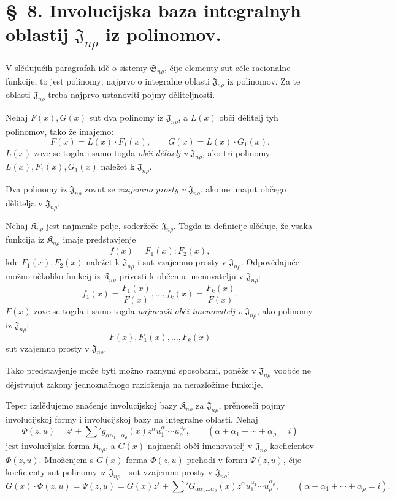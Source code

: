 \documentclass[11pt]{article}
\providecommand{\Kfield}{\mathfrak{K}}
\providecommand{\Ssys}{\mathfrak{S}}
\providecommand{\Jdom}{\mathfrak{J}}
\begin{document}
\section*{\S\ 8. Involucijska baza integralnyh oblastij $\Jdom_{n\rho}$ iz polinomov.}

V slědujućih paragrafah idě o sistemy $\Ssys_{n\rho}$, čije elementy sut cěle racionalne funkcije, to jest polinomy; najprvo o integralne oblasti $\Jdom_{n\rho}$ iz polinomov. Za te oblasti $\Jdom_{n\rho}$ treba najprvo ustanoviti pojmy děliteljnosti.

Nehaj $F(x),G(x)$ sut dva polinomy iz $\Jdom_{n\rho}$, a $L(x)$ obči dělitelj tyh polinomov, tako že imajemo:
\[
  F(x)=L(x)\cdot F_1(x),\qquad G(x)=L(x)\cdot G_1(x).
\]
$L(x)$ zove se togda i samo togda {\itshape obči dělitelj v $\Jdom_{n\rho}$}, ako tri polinomy $L(x),F_1(x),G_1(x)$ naležet k $\Jdom_{n\rho}$.

Dva polinomy iz $\Jdom_{n\rho}$ zovut se {\itshape vzajemno prosty v $\Jdom_{n\rho}$}, ako ne imajut občego dělitelja v $\Jdom_{n\rho}$.

Nehaj $\Kfield_{n\rho}$ jest najmenše polje, soderžeče $\Jdom_{n\rho}$. Togda iz definicije slěduje, že vsaka funkcija iz $\Kfield_{n\rho}$ imaje predstavjenje
\[
  f(x)=F_1(x):F_2(x),
\]
kde $F_1(x),F_2(x)$ naležet k $\Jdom_{n\rho}$ i sut vzajemno prosty v $\Jdom_{n\rho}$. Odpovědajuče možno několiko funkcij iz $\Kfield_{n\rho}$ privesti k občemu imenovatelju v $\Jdom_{n\rho}$:
\[
  f_1(x)=\frac{F_1(x)}{F(x)},\ldots,
  f_k(x)=\frac{F_k(x)}{F(x)}.
\]
$F(x)$ zove se togda i samo togda {\itshape najmenši obči imenovatelj v $\Jdom_{n\rho}$}, ako polinomy iz $\Jdom_{n\rho}$:
\[
  F(x),F_1(x),\ldots,F_k(x)
\]
sut vzajemno prosty v $\Jdom_{n\rho}$.

Tako predstavjenje može byti možno raznymi sposobami, poněže v $\Jdom_{n\rho}$ voobće ne dějstvujut zakony jednoznačnogo razloženja na nerazložime funkcije.

Teper izslědujemo značenje involucijskoj bazy $\Kfield_{n\rho}$ za $\Jdom_{n\rho}$, prěnoseči pojmy involucijskoj formy i involucijskoj bazy na integralne oblasti. Nehaj
\[
  \Phi(z,u)=z^i+\sum{}' g_{\alpha\alpha_1\ldots\alpha_\rho}(x)
  z^\alpha u_1^{\alpha_1}\cdots u_\rho^{\alpha_\rho},
  \qquad
  (\alpha+\alpha_1+\cdots+\alpha_\rho=i)
\]
jest involucijska forma $\Kfield_{n\rho}$, a $G(x)$ najmenši obči imenovatelj v $\Jdom_{n\rho}$ koeficientov $\Phi(z,u)$. Množenjem s $G(x)$ forma $\Phi(z,u)$ prehodi v formu $\Psi(z,u)$, čije koeficienty sut polinomy iz $\Jdom_{n\rho}$ i sut vzajemno prosty v $\Jdom_{n\rho}$:
\[
  G(x)\cdot\Phi(z,u)=\Psi(z,u)
  =G(x)z^i+
  \sum{}' G_{\alpha\alpha_1\ldots\alpha_\rho}(x)
  z^\alpha u_1^{\alpha_1}\cdots u_\rho^{\alpha_\rho},
  \qquad
  (\alpha+\alpha_1+\cdots+\alpha_\rho=i).
\]
\end{document}
